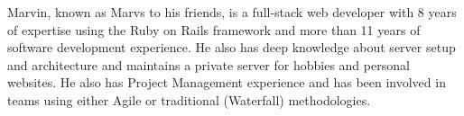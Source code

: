 

\begin{cvparagraph}

Marvin, known as Marvs to his friends, is a full-stack web developer with 8 years of expertise using the Ruby on Rails framework and more than 11 years of software development experience. He also has deep knowledge about server setup and architecture and maintains a private server for hobbies and personal websites. He also has Project Management experience and has been involved in teams using either Agile or traditional (Waterfall) methodologies.
\end{cvparagraph}
